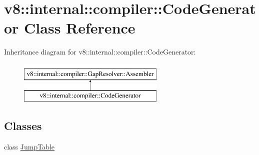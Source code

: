 \hypertarget{classv8_1_1internal_1_1compiler_1_1CodeGenerator}{}\section{v8\+:\+:internal\+:\+:compiler\+:\+:Code\+Generator Class Reference}
\label{classv8_1_1internal_1_1compiler_1_1CodeGenerator}
Inheritance diagram for v8\+:\+:internal\+:\+:compiler\+:\+:Code\+Generator\+:\begin{figure}[H]
\begin{center}
\leavevmode
\includegraphics[height=2.000000cm]{classv8_1_1internal_1_1compiler_1_1CodeGenerator}
\end{center}
\end{figure}
\subsection*{Classes}
\begin{DoxyCompactItemize}
\item 
class \mbox{\hyperlink{classv8_1_1internal_1_1compiler_1_1CodeGenerator_1_1JumpTable}{Jump\+Table}}
\end{DoxyCompactItemize}

